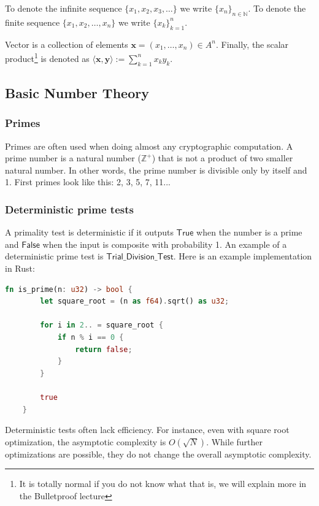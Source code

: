\documentclass[../lecture-notes.tex]{subfiles}
\begin{document}
To denote the infinite sequence $\{x_1,x_2,x_3,\dots\}$ we write $\{x_n\}_{n \in \mathbb{N}}$. To denote the finite sequence $\{x_1,x_2,\dots,x_n\}$ we write $\{x_k\}_{k=1}^n$. 

Vector is a collection of elements $\mathbf{x} = (x_1,\dots,x_n) \in A^n$. Finally, the scalar product\footnote{It is totally normal if you do not know what that is, we will explain more in the Bulletproof lecture} is denoted as $\langle \mathbf{x}, \mathbf{y} \rangle := \sum_{k=1}^n x_ky_k$.

\subsection{Basic Number Theory}

\subsubsection{Primes}

Primes are often used when doing almost any cryptographic computation. A prime number is a natural number ($\mathbb{Z}^{+}$) that is not a product
of two smaller natural number. In other words, the prime number is divisible only by itself and 1. First primes look like this: 2, 3, 5, 7, 11...

\subsubsection{Deterministic prime tests}

A primality test is deterministic if it outputs $\mathsf{True}$ when the number is a prime and $\mathsf{False}$ when the input is composite with probability 1.
An example of a deterministic prime test is $\mathsf{Trial\_Division\_Test}$. Here is an example implementation in Rust: 

\begin{lstlisting}[language=Rust]
    fn is_prime(n: u32) -> bool {
        let square_root = (n as f64).sqrt() as u32;

        for i in 2.. = square_root {
            if n % i == 0 {
                return false;
            }
        }

        true
    }
\end{lstlisting}

Deterministic tests often lack efficiency. For instance, even with square root optimization, the asymptotic complexity is $O(\sqrt{N})$. 
While further optimizations are possible, they do not change the overall asymptotic complexity.
\end{document}
